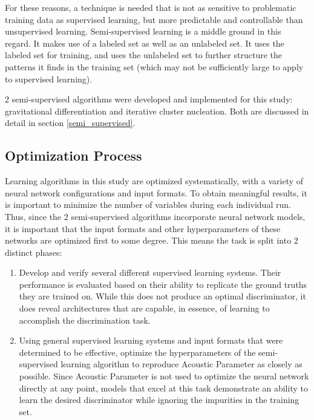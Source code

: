 \documentclass[10pt]{article}
\begin{document}
For these reasons, a technique is needed that is not as sensitive to problematic training data as supervised learning, but more predictable and controllable than unsupervised learning. Semi-supervised learning is a middle ground in this regard. It makes use of a labeled set as well as an unlabeled set. It uses the labeled set for training, and uses the unlabeled set to further structure the patterns it finds in the training set (which may not be sufficiently large to apply to supervised learning).

2 semi-supervised algorithms were developed and implemented for this study: gravitational differentiation and iterative cluster nucleation. Both are discussed in detail in section \ref{semi_supervised}.

\subsection{Optimization Process}

Learning algorithms in this study are optimized systematically, with a variety of neural network configurations and input formats. To obtain meaningful results, it is important to minimize the number of variables during each individual run. Thus, since the 2 semi-supervised algorithms incorporate neural network models, it is important that the input formats and other hyperparameters of these networks are optimized first to some degree. This means the task is split into 2 distinct phases:

\begin{enumerate}
    \item Develop and verify several different supervised learning systems. Their performance is evaluated based on their ability to replicate the ground truths they are trained on. While this does not produce an optimal discriminator, it does reveal architectures that are capable, in essence, of learning to accomplish the discrimination task.
    \item Using general supervised learning systems and input formats that were determined to be effective, optimize the hyperparameters of the semi-supervised learning algorithm to reproduce Acoustic Parameter as closely as possible. Since Acoustic Parameter is not used to optimize the neural network directly at any point, models that excel at this task demonstrate an ability to learn the desired discriminator while ignoring the impurities in the training set.
\end{enumerate}
\end{document}
